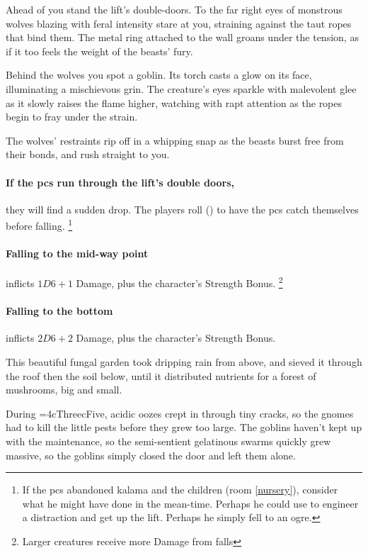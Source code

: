 \begin{boxtext}
  Ahead of you stand the lift's double-doors.
  To the far right eyes of monstrous wolves blazing with feral intensity stare at you, straining against the taut ropes that bind them.
  The metal ring attached to the wall groans under the tension, as if it too feels the weight of the beasts' fury.

  Behind the wolves you spot a goblin.
  Its torch casts a glow on its face, illuminating a mischievous grin.
  The creature's eyes sparkle with malevolent glee as it slowly raises the flame higher, watching with rapt attention as the ropes begin to fray under the strain.

  The wolves' restraints rip off in a whipping snap as the beasts burst free from their bonds, and rush straight to you.
\end{boxtext}

\paragraph{If the \glspl{pc} run through the lift's double doors,}
they will find a sudden drop.
The players roll  (\tn[7]) to have the \glspl{pc} catch themselves before falling.%
\footnote{If the \glspl{pc} abandoned \gls{kalama} and the children (room \vref{nursery}), consider what he might have done in the mean-time.
Perhaps he could use  to engineer a distraction and get up the lift.
Perhaps he simply fell to an ogre.}

\paragraph{Falling to the mid-way point}
inflicts $1D6+1$ Damage, plus the character's Strength Bonus.%
\footnote{Larger creatures receive more Damage from falls}

\paragraph{Falling to the bottom}
inflicts $2D6+2$ Damage, plus the character's Strength Bonus.%



\begin{exampletext}
  This beautiful fungal garden took dripping rain from above, and sieved it through the roof then the soil below, until it distributed nutrients for a forest of mushrooms, big and small.

  During \ifnum\value{cycle}=4\gls{cThree}\else\gls{cFive}\fi, acidic oozes crept in through tiny cracks, so the gnomes had to kill the little pests before they grew too large.
  The goblins haven't kept up with the maintenance, so the semi-sentient gelatinous \glspl{swarm} quickly grew massive, so the goblins simply closed the door and left them alone.
\end{exampletext}

